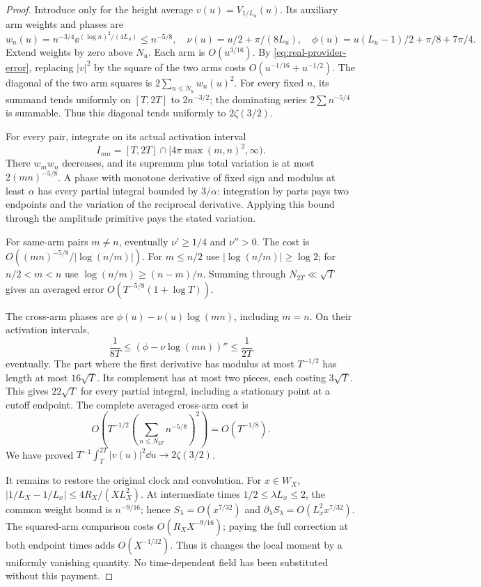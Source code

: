 \begin{proof}
Introduce only for the height average
\(v(u)=V_{1/L_u}(u)\). Its auxiliary arm weights and phases are
\[
 w_n(u)=n^{-3/4}\ee^{(\log n)^2/(4L_u)}\le n^{-5/8},\quad
 \nu(u)=u/2+\pi/(8L_u),\quad
 \phi(u)=u(L_u-1)/2+\pi/8+7\pi/4.
\]
Extend weights by zero above \(N_u\). Each arm is \(O(u^{3/16})\).
By \eqref{eq:real-provider-error}, replacing \(|v|^2\) by the
square of the two arms costs \(O(u^{-1/16}+u^{-1/2})\).
The diagonal of the two arm squares is \(2\sum_{n\le N_u}w_n(u)^2\).
For every fixed \(n\), its summand tends uniformly on \([T,2T]\)
to \(2n^{-3/2}\); the dominating series \(2\sum n^{-5/4}\)
is summable. Thus this diagonal tends uniformly to \(2\zeta(3/2)\).

For every pair, integrate on its actual activation interval
\[
 I_{mn}=[T,2T]\cap[4\pi\max(m,n)^2,\infty).
\]
There \(w_mw_n\) decreases, and its supremum plus total variation
is at most \(2(mn)^{-5/8}\). A phase with monotone derivative of
fixed sign and modulus at least \(\alpha\) has every partial
integral bounded by \(3/\alpha\): integration by parts pays two
endpoints and the variation of the reciprocal derivative. Applying
this bound through the amplitude primitive pays the stated variation.

For same-arm pairs \(m\ne n\), eventually \(\nu'\ge1/4\) and
\(\nu''>0\). The cost is
\(O((mn)^{-5/8}/|\log(n/m)|)\). For \(m\le n/2\) use
\(|\log(n/m)|\ge\log2\); for \(n/2<m<n\) use
\(\log(n/m)\ge(n-m)/n\). Summing through \(N_{2T}\ll\sqrt T\)
gives an averaged error \(O(T^{-5/8}(1+\log T))\).

The cross-arm phases are \(\phi(u)-\nu(u)\log(mn)\), including
\(m=n\). On their activation intervals,
\[
 \frac1{8T}\le(\phi-\nu\log(mn))''\le\frac1{2T}
\]
eventually. The part where the first derivative has modulus at most
\(T^{-1/2}\) has length at most \(16\sqrt T\). Its complement
has at most two pieces, each costing \(3\sqrt T\). This gives
\(22\sqrt T\) for every partial integral, including a stationary
point at a cutoff endpoint. The complete averaged cross-arm cost is
\[
 O\left(T^{-1/2}\left(\sum_{n\le N_{2T}}n^{-5/8}\right)^2\right)
       =O(T^{-1/8}).
\]
We have proved \(T^{-1}\int_T^{2T}|v(u)|^2\dd u\to2\zeta(3/2)\).

It remains to restore the original clock and convolution. For
\(x\in W_X\), \(|1/L_X-1/L_x|\le4R_X/(XL_X^2)\).
At intermediate times \(1/2\le\lambda L_x\le2\), the common
weight bound is \(n^{-9/16}\); hence
\(S_\lambda=O(x^{7/32})\) and
\(\partial_\lambda S_\lambda=O(L_x^2x^{7/32})\).
The squared-arm comparison costs \(O(R_XX^{-9/16})\); paying the
full correction at both endpoint times adds \(O(X^{-1/32})\).
Thus it changes the local moment by a uniformly vanishing quantity.
No time-dependent field has been substituted without this payment.


\end{proof}
